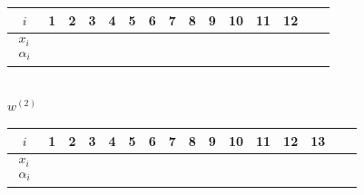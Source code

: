 \documentclass[12pt]{article}
\def\red{\textcolor{red}}
\numberwithin{equation}{section}
\def\red{\textcolor{red}}
\theoremstyle{plain}
\def\green{\textcolor{blue}}
\begin{document}
\begin{table}[h]
	\centering
	\begin{minipage}{0.45\textwidth}
		\centering
		\vspace{0.3em}
		\fontsize{11}{9}\selectfont  %
		\renewcommand{\arraystretch}{1.5}  %
		\setlength{\tabcolsep}{0.38em} %
		\begin{tabular}{c|cccccccccccccc}
			$i$ & 1 & 2 & 3 & 4 & 5 & 6 & 7 & 8 & 9 & 10 &11&12 \\
			\hline
			\multirow{2}{*}{$\begin{array}{c} x_i \\ \alpha_i \end{array}$} 
			& \makebox[0.7em][r]{1} & \makebox[0.7em][r]{1} & \makebox[0.7em][r]{1} & \makebox[0.7em][r]{2} & \makebox[0.7em][r]{2} & \makebox[0.7em][r]{2} & \makebox[0.7em][r]{3} & \makebox[0.7em][r]{3} & \makebox[0.7em][r]{4} & \makebox[0.7em][r]{4} & \makebox[0.7em][r]{5} & \makebox[0.7em][r]{5} \\
			& \makebox[0.7em][r]{$_{\green{6}}\red{3}$}
			& \makebox[0.7em][r]{$_{\green{7}}2$} 
			& \makebox[0.7em][r]{$_{\green{8}}2$} 
			& \makebox[0.7em][r]{$_{\green{5}}\red{4}$} 
			& \makebox[0.7em][r]{$_{\green{9}}1$} 
			& \makebox[0.7em][r]{$_{\green{4}}\red{5}$} 
			& \makebox[0.7em][r]{$_{\green{3}}\red{5}$} 
			& \makebox[0.7em][r]{$_{\green{10}}4$} 
			& \makebox[0.7em][r]{$_{\green{2}}3$} 
			& \makebox[0.7em][r]{$_{\green{1}}1$}
			& \makebox[0.7em][r]{$_{\green{0}}2$}
			& \makebox[0.7em][r]{$_*1$}
			& \makebox[0em][r]{$_*$} \\
		\end{tabular}
		\\[0.5em] %
		{\small $w^{(2)}$} %
	\end{minipage}
	\hfill
	\begin{minipage}{0.45\textwidth}
		\centering
		\vspace{0.3em}
		\fontsize{11}{9}\selectfont  %
		\renewcommand{\arraystretch}{1.5}  %
		\setlength{\tabcolsep}{0.3em} %
		\begin{tabular}{c|ccccccccccccccc}
			$i$ & 1 & 2 & 3 & 4 & 5 & 6 & 7 & 8 & 9 & 10 &11&12&13 \\
			\hline
			\multirow{2}{*}{$\begin{array}{c} x_i \\ \alpha_i \end{array}$} 
			& \makebox[0.7em][r]{1} & \makebox[0.7em][r]{1} & \makebox[0.7em][r]{1} & \makebox[0.7em][r]{2} & \makebox[0.7em][r]{2} & \makebox[0.7em][r]{2} & \makebox[0.7em][r]{3} & \makebox[0.7em][r]{3} & \makebox[0.7em][r]{4} & \makebox[0.7em][r]{4} & \makebox[0.7em][r]{5} & \makebox[0.7em][r]{5} & \makebox[0.7em][r]{5}\\

\end{tabular}
\end{minipage}
\end{table}
\end{document}
